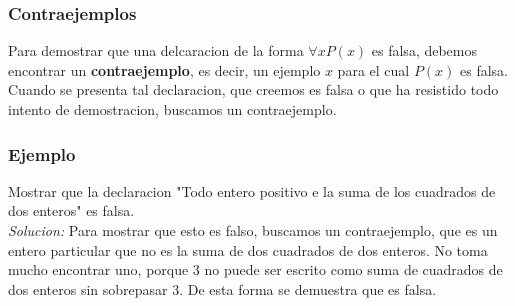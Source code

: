 \documentclass[]{article}
\begin{document}
\subsubsection*{Contraejemplos}

Para demostrar que una delcaracion de la forma $\forall xP(x)$ es falsa, debemos encontrar un \textbf{contraejemplo}, es decir, un ejemplo $x$ para el cual $P(x)$ es falsa. Cuando se presenta tal declaracion, que creemos es falsa o que ha resistido todo intento de demostracion, buscamos un contraejemplo.

\subsubsection*{Ejemplo}

Mostrar que la declaracion "Todo entero positivo e la suma de los cuadrados de dos enteros" es falsa.\\

\textit{Solucion:} Para mostrar que esto es falso, buscamos un contraejemplo, que es un entero particular que no es la suma de dos cuadrados de dos enteros. No toma mucho encontrar uno, porque $3$ no puede ser escrito como suma de cuadrados de  dos enteros sin sobrepasar $3$. De esta forma se demuestra que es falsa.
\end{document}
